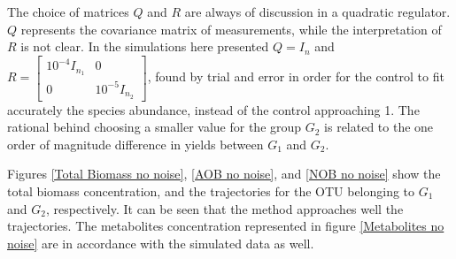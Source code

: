 \documentclass[3p,times]{elsarticle}
\begin{document}
The choice of matrices $Q$ and $R$ are always of discussion in a quadratic regulator. $Q$ represents the covariance matrix of measurements, while the interpretation of $R$ is not clear. In the simulations here presented $Q = I_n$ and $R = \begin{bmatrix}
10^{-4}I_{n_1} & 0 \\ 0 & 10^{-5}I_{n_2}
\end{bmatrix}$, found by trial and error in order for the control to fit accurately the species abundance, instead of the control approaching 1. The rational behind choosing a smaller value for the group $G_2$ is related to the one order of magnitude difference in yields between $G_1$ and $G_2$.


Figures \ref{Total Biomass no noise}, \ref{AOB no noise}, and \ref{NOB no noise} show the total biomass concentration, and the trajectories for the OTU belonging to $G_1$ and $G_2$, respectively. It can be seen that the method approaches well the trajectories. The metabolites concentration represented in figure \ref{Metabolites no noise} are in accordance with the simulated data as well. 
\end{document}
